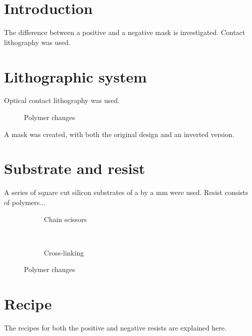 \section*{Introduction}
The difference between a positive and a negative mask is investigated. Contact lithography was used.

\section*{Lithographic system}
Optical contact lithography was used.
\begin{figure}[H]
	\centering
	\resizebox{0.7\linewidth}{!}{}
	\caption{Polymer changes}
	\label{fig:contact-litho}
\end{figure}
A mask was created, with both the original design and an inverted version.

\section*{Substrate and resist}
A series of square cut silicon substrates of a by a mm  were used. Resist consists of polymers...

\begin{figure}[H]
	\centering
	\begin{subfigure}[t]{0.45\linewidth}
		\centering
		\resizebox{\linewidth}{!}{}
		\caption{Chain scissors}
		\label{fig:chainscissor}
	\end{subfigure}
	~
	\begin{subfigure}[t]{0.45\linewidth}
		\centering
		\resizebox{\linewidth}{!}{}
		\caption{Cross-linking}
		\label{fig:crosslinking}
	\end{subfigure}
	\caption{Polymer changes}
	\label{fig:polymers}
\end{figure}


\section*{Recipe}
The recipes for both the positive and negative resists are explained here.

